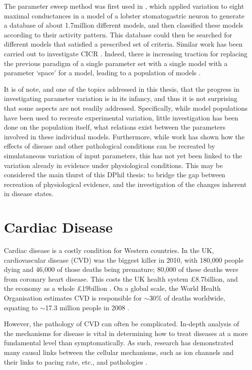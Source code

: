 \documentclass[../thesis-main.tex]{subfiles}
\begin{document}
 The parameter sweep method was first used in \citet{Prinz2003}, which applied variation to eight maximal conductances in a model of a lobster stomatogastric neuron to generate a database of about 1.7million different models, and then classified these models according to their activity pattern. This database could then be searched for different models that satisfied a prescribed set of criteria. Similar work has been carried out to investigate CICR \citep{Sobie2009a}. Indeed, there is increasing traction for replacing the previous paradigm of a single parameter set with a single model with a parameter `space' for a model, leading to a population of models \citep{Davies2012, Taylor2009, Prinz2003, Marder2011}.
 
 It is of note, and one of the topics addressed in this thesis, that the progress in investigating parameter variation is in its infancy, and thus it is not surprising that some aspects are not readily addressed. Specifically, while model populations have been used to recreate experimental variation, little investigation has been done on the population itself, \idest{} what relations exist between the parameters involved in these individual models. Furthermore, while work has shown how the effects of disease and other pathological conditions can be recreated by simulataneous variation of input parameters, this has not yet been linked to the variation already in evidence under physiological conditions. This may be considered the main thurst of this DPhil thesis: to bridge the gap between recreation of physiological evidence, and the investigation of the changes inherent in disease states.
 
 \section{Cardiac Disease}
 \label{sec:disease}
 Cardiac disease is a costly condition for Western countries. In the UK, cardiovascular disease (CVD) was the biggest killer in 2010, with 180,000 people dying and 46,000 of those deaths being premature; 80,000 of these deaths were from coronary heart disease. This costs the UK health system \pounds8.7billion, and the economy as a whole \pounds19billion \citep{Townsend2012}. On a global scale, the World Health Organisation estimates CVD is responsible for $\sim$30$\%$ of deaths worldwide, equating to $\sim$17.3 million people in 2008 \citep{WHO2010}.
 
 However, the pathology of CVD can often be complicated. In-depth analysis of the mechanisms for disease is vital in determining how to treat diseases at a more fundamental level than symptomatically. As such, research has demonstrated many causal links between the cellular mechanisms, such as ion channels and their links to pacing rate, etc., and pathologies \citep{Inoue2006a, Kurz1993, Rodriguez2006, Dumaine1996, Nattel2010, Jurkat-Rott2005, Biagetti2006}.
 
\end{document}
